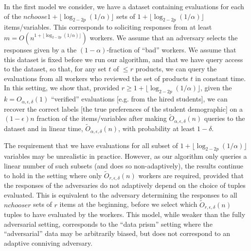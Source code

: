 \documentclass[anon,12pt]{colt2018}
\newcommand{\eps}{\epsilon}
\begin{document}
In the first model we consider, we have a dataset containing evaluations for each of the ${n choose 1+\lfloor \log_{2-2p}(1/\alpha)\rfloor}$ sets of $1+\lfloor \log_{2-2p}(1/\alpha)\rfloor$ items/variables.  This corresponds to soliciting responses from at least $m = O\left(n^{1+\lfloor \log_{2-2p}(1/\alpha)\rfloor} \right)$ workers.  We assume that an adversary selects the responses given by a the $(1-\alpha)$-fraction of ``bad'' workers.  We assume that this dataset is fixed before we run our algorithm, and that we have query access to the dataset, so that, for any set $t$ of $\le r$ products, we can query the evaluations from all workers who reviewed the set of products $t$ in constant time. In this setting, we show that, provided $r\ge 1+\lfloor \log_{2-2p}(1/\alpha)\rfloor$, given the $k=O_{\alpha,\eps,\delta}(1)$ ``verified'' evaluations [e.g. from the hired students], we can recover the correct labels [the true preferences of the student demographic] on a $(1-\eps)n$ fraction of the items/variables after making $\tilde{O}_{\alpha,\eps,\delta}(n)$ queries to the dataset and in linear time, $\tilde{O}_{\alpha,\eps,\delta}(n)$, with probability at least $1-\delta$.

The requirement that we have evaluations for all subset of $1+\lfloor \log_{2-2p}(1/\alpha)\rfloor$ variables may be unrealistic in practice.  However, as our algorithm only queries a linear number of such subsets (and does so non-adaptively), the results continue to hold in the setting where only $\tilde{O}_{r,\eps,\delta}(n)$ workers are required, provided that the responses of the adversaries do not adaptively depend on the choice of tuples evaluated.  This is equivalent to the adversary determining the responses to all ${n choose r}$ sets of $r$ items at the beginning, before we select which $\tilde{O}_{r,\eps,\delta}(n)$ tuples to have evaluated by the workers.   This model, while weaker than the fully adversarial setting, corresponds to the ``data prism'' setting where the ``adversarial'' data may be arbitrarily biased, but does not correspond to an adaptive conniving adversary.

\end{document}
